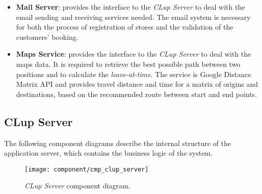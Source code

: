 \begin{itemize}
	\item \textbf{Mail Server}: provides the interface to the \textit{CLup Server} to deal with the email sending and receiving services needed. The email system is necessary for both the process of registration of stores and the validation of the customers' booking.
	
	\item \textbf{Maps Service}: provides the interface to the \textit{CLup Server} to deal with the maps data. It is required to retrieve the best possible path between two positions and to calculate the \textit{leave-at-time}.\newline
	The service is Google Distance Matrix API and provides travel distance and time for a matrix of origins and destinations, based on the recommended route between start and end points.
\end{itemize}

\clearpage

\subsection{CLup Server}
The following component diagrams describe the internal structure of the application server, which contains the business logic of the system.

\begin{figure}[H]
	\centering
	\texttt{[image: component/cmp\_clup\_server]}
	\caption{\textit{CLup Server} component diagram.}
	\label{fig:cmp_clup_server}
\end{figure}
\clearpage

